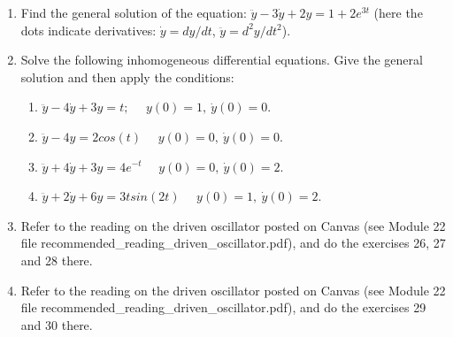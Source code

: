 \documentclass[fleqn]{article}
\begin{document}
  \begin{enumerate}
    \item Find the general solution of the equation: $\ddot y-3\dot y+2y=1+2 e^{3t}$ (here the dots indicate derivatives: $\dot y=dy/dt$, $\ddot y=d^2y/dt^2$).

    \item Solve the following inhomogeneous differential equations. Give the general solution and then apply the conditions:

      \begin{enumerate}
        \item $\ddot y-4 \dot y+3y=t; ~~~~~~ y(0)=1, ~ \dot y(0)=0.$
        \item $\ddot y-4y=2cos(t) ~~~~~~ y(0)=0, ~ \dot y(0)=0.$
        \item $\ddot y+4\dot y+3y=4e^{-t} ~~~~~~ y(0)=0, ~ \dot y(0)=2.$
        \item $\ddot y+2 \dot y+6y=3tsin(2t) ~~~~~~ y(0)=1, ~ \dot y(0)=2.$
      \end{enumerate}

    \item Refer to the reading on the driven oscillator posted on Canvas (see Module 22 file recommended\_reading\_driven\_oscillator.pdf), and do the exercises 26, 27 and 28 there. 

    \item Refer to the reading on the driven oscillator posted on Canvas (see Module 22 file recommended\_reading\_driven\_oscillator.pdf), and do the exercises 29 and 30 there. 
          
  \end{enumerate}
\end{document}
